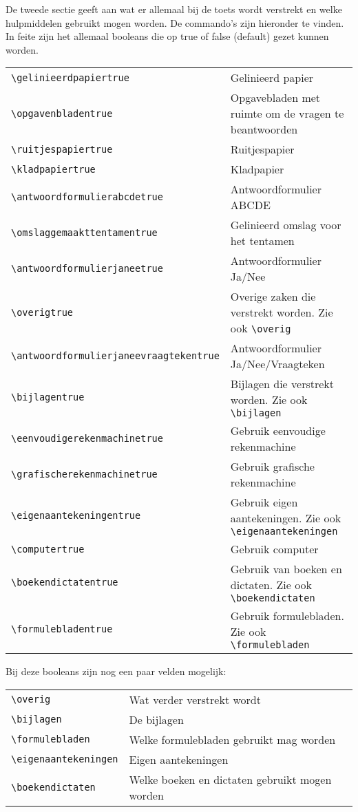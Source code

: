 \documentclass[dutch,a4paper,12pt,addpoints,fleqn,oneside]{tisdexam}
\begin{document}
\bigskip
De tweede sectie geeft aan wat er allemaal bij de toets wordt verstrekt en welke hulpmiddelen gebruikt
mogen worden. De commando's zijn hieronder te vinden. In feite zijn het allemaal booleans die op true
of false (default) gezet kunnen worden.

\bigskip
\begin{tabular}{lp{8cm}}
\verb|\gelinieerdpapiertrue| & Gelinieerd papier \\
\verb|\opgavenbladentrue| & Opgavebladen met ruimte om de vragen te beantwoorden \\
\verb|\ruitjespapiertrue| & Ruitjespapier \\
\verb|\kladpapiertrue| & Kladpapier \\
\verb|\antwoordformulierabcdetrue| & Antwoordformulier ABCDE \\
\verb|\omslaggemaakttentamentrue| & Gelinieerd omslag voor het tentamen \\
\verb|\antwoordformulierjaneetrue| & Antwoordformulier Ja/Nee \\
\verb|\overigtrue| & Overige zaken die verstrekt worden. Zie ook \verb|\overig| \\
\verb|\antwoordformulierjaneevraagtekentrue| & Antwoordformulier Ja/Nee/Vraagteken \\
\verb|\bijlagentrue| & Bijlagen die verstrekt worden. Zie ook \verb|\bijlagen| \\
\verb|\eenvoudigerekenmachinetrue| & Gebruik eenvoudige rekenmachine \\ 
\verb|\grafischerekenmachinetrue| & Gebruik grafische rekenmachine \\
\verb|\eigenaantekeningentrue| & Gebruik eigen aantekeningen. Zie ook \verb|\eigenaantekeningen| \\
\verb|\computertrue| & Gebruik computer \\
\verb|\boekendictatentrue| & Gebruik van boeken en dictaten. Zie ook \verb|\boekendictaten| \\
\verb|\formulebladentrue| & Gebruik formulebladen. Zie ook \verb|\formulebladen| \\
\end{tabular}

\medskip
Bij deze booleans zijn nog een paar velden mogelijk:

\bigskip
\begin{tabular}{lp{15cm}}
\verb|\overig| & Wat verder verstrekt wordt \\
\verb|\bijlagen| & De bijlagen \\
\verb|\formulebladen| & Welke formulebladen gebruikt mag worden \\
\verb|\eigenaantekeningen| & Eigen aantekeningen \\
\verb|\boekendictaten| & Welke boeken en dictaten gebruikt mogen worden \\
\end{tabular}
\end{document}
